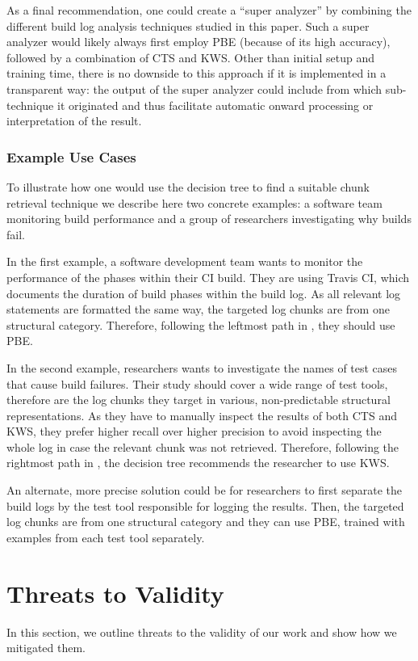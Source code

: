 As a final recommendation, one could create a ``super analyzer'' by
combining the different build log analysis techniques studied in this
paper.
Such a super analyzer would likely always first employ PBE
(because of its high accuracy), followed by a combination of CTS and
KWS\@.
Other than initial setup and training time, there is no
downside to this approach if it is implemented in a transparent way:
the output of the super analyzer could include from which
sub-technique it originated and thus facilitate automatic onward
processing or interpretation of the result.


\subsubsection{Example Use Cases}
To illustrate how one would use the decision tree to find a suitable
chunk retrieval technique we describe here two concrete examples:
a software team monitoring build performance and a
group of researchers investigating why builds fail.

In the first example, a software development team wants to monitor
the performance of the phases within their CI build.
They are using
Travis CI, which documents the duration of build phases
within the build log.
As all relevant log statements are formatted the same way,
the targeted log chunks are from one structural category.
Therefore, following the leftmost path in
,
they should use PBE.

In the second example, researchers wants to investigate the names
of test cases that cause build failures.
Their study should cover a wide range of test tools, therefore are the
log chunks they target in various, non-predictable structural
representations.
As they have to manually inspect the results of both CTS
and KWS, they prefer higher recall over higher precision to
avoid inspecting
the whole log in case the relevant chunk was not retrieved.
Therefore, following the rightmost path in
,
the decision tree recommends the researcher to use KWS\@.

An alternate, more precise solution
could be for researchers to first separate the build logs by the
test tool responsible for logging the results.
Then, the
targeted log chunks are from one structural category and they can use
PBE, trained with examples from each test tool separately.


\section{Threats to Validity}
In this section, we outline threats to the validity of our work and
show how we mitigated them.

